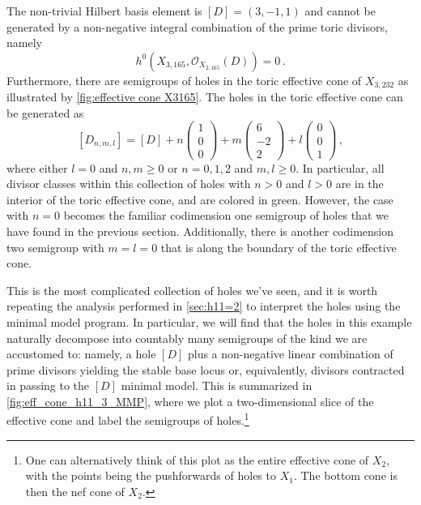 \documentclass[11pt,dvipsnames]{article}
\theoremstyle{definition}
\newcommand{\cO}{\mathcal{O}}
\begin{document}
The non-trivial Hilbert basis element is $[D]=(3,-1,1)$ and cannot be generated by a non-negative integral combination of the prime toric divisors, namely 
\begin{equation}
    h^0(X_{3,165},\cO_{X_{2,165}}(D))=0\,.
\end{equation}
Furthermore, there are semigroups of holes in the toric effective cone of $X_{3,232}$ as illustrated by \cref{fig:effective cone X3165}. The holes in the toric effective cone can be generated as 
\begin{equation}
    \label{eq:h11_3_interior_holes}
    [D_{n,m,l}]=[D]+n
    \begin{pmatrix}
        1\\
        0\\
        0
    \end{pmatrix}+m\begin{pmatrix}
        6\\
        -2\\
        2
    \end{pmatrix}
    +l\begin{pmatrix}
        0\\
        0\\
        1
    \end{pmatrix}\,,
\end{equation}
where either $l = 0$ and $n,m \geq 0$ or $n=0,1,2$ and $m,l\geq 0$.
In particular, all divisor classes within this collection of holes with $n>0$ and $l > 0$ are in the interior of the toric effective cone, and are colored in green. However, the case with $n=0$ becomes the familiar codimension one semigroup of holes that we have found in the previous section. Additionally, there is another codimension two semigroup with $m=l=0$ that is along the boundary of the toric effective cone. 

This is the most complicated collection of holes we've seen, and it is worth repeating the analysis performed in \cref{sec:h11=2} to interpret the holes using the minimal model program. In particular, we will find that the holes in this example naturally decompose into countably many semigroups of the kind we are accustomed to: namely, a hole $[D]$ plus a non-negative linear combination of prime divisors yielding the stable base locus or, equivalently, divisors contracted in passing to the $[D]$ minimal model. This is summarized in \cref{fig:eff_cone_h11_3_MMP}, where we plot a two-dimensional slice of the effective cone and label the semigroups of holes.\footnote{One can alternatively think of this plot as the entire effective cone of $X_2$, with the points being the pushforwards of holes to $X_1$. The bottom cone is then the nef cone of $X_2$.} 
\end{document}
